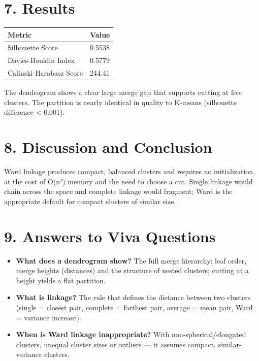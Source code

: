 \section{7. Results}\label{results-1}

{\def\LTcaptype{none} %
\begin{longtable}[]{@{}ll@{}}
\toprule\noalign{}
Metric & Value \\
\midrule\noalign{}
\endhead
\bottomrule\noalign{}
\endlastfoot
Silhouette Score & 0.5538 \\
Davies-Bouldin Index & 0.5779 \\
Calinski-Harabasz Score & 244.41 \\
\end{longtable}
}

The dendrogram shows a clear large merge gap that supports cutting at
five clusters. The partition is nearly identical in quality to K-means
(silhouette difference \textless{} 0.001).

\section{8. Discussion and
Conclusion}\label{discussion-and-conclusion-1}

Ward linkage produces compact, balanced clusters and requires no
initialization, at the cost of O(n²) memory and the need to choose a
cut. Single linkage would chain across the space and complete linkage
would fragment; Ward is the appropriate default for compact clusters of
similar size.

\section{9. Answers to Viva
Questions}\label{answers-to-viva-questions-1}

\begin{itemize}
\tightlist
\item
  \textbf{What does a dendrogram show?} The full merge hierarchy: leaf
  order, merge heights (distances) and the structure of nested clusters;
  cutting at a height yields a flat partition.
\item
  \textbf{What is linkage?} The rule that defines the distance between
  two clusters (single = closest pair, complete = farthest pair, average
  = mean pair, Ward = variance increase).
\item
  \textbf{When is Ward linkage inappropriate?} With
  non-spherical/elongated clusters, unequal cluster sizes or outliers
  --- it assumes compact, similar-variance clusters.
\end{itemize}

